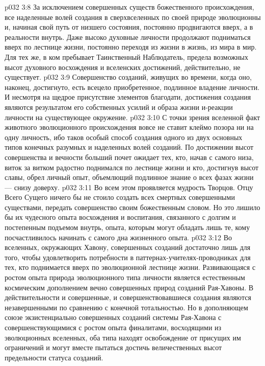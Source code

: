 \vs p032 3:8 \pc За исключением совершенных существ божественного происхождения, все наделенные волей создания в сверхвселенных по своей природе эволюционны и, начиная свой путь от низшего состояния, постоянно продвигаются вверх, а в реальности внутрь. Даже высоко духовные личности продолжают подниматься вверх по лестнице жизни, постоянно переходя из жизни в жизнь, из мира в мир. Для тех же, в ком пребывает Таинственный Наблюдатель, предела возможных высот духовного восхождения и вселенских достижений, действительно, не существует.
\vs p032 3:9 Совершенство созданий, живущих во времени, когда оно, наконец, достигнуто, есть всецело приобретенное, подлинное владение личности. И несмотря на щедрое присутствие элементов благодати, достижения создания являются результатом его собственных усилий и образа жизни и\hyp{}реакции личности на существующее окружение.
\vs p032 3:10 С точки зрения вселенной факт животного эволюционного происхождения вовсе не ставит клеймо позора ни на одну личность, ибо таков особый способ создания одного из двух основных типов конечных разумных и наделенных волей созданий. По достижении высот совершенства и вечности больший почет ожидает тех, кто, начав с самого низа, виток за витком радостно поднимался по лестнице жизни и кто, достигнув высот славы, обрел личный опыт, объемлющий подлинное знание о всех фазах жизни --- снизу доверху.
\vs p032 3:11 Во всем этом проявляется мудрость Творцов. Отцу Всего Сущего ничего бы не стоило создать всех смертных совершенными существами, передать совершенство своим божественным словом. Но это лишило бы их чудесного опыта восхождения и воспитания, связанного с долгим и постепенным подъемом внутрь, опыта, которым могут обладать лишь те, кому посчастливилось начинать с самого дна жизненного опыта.
\vs p032 3:12 Во вселенных, окружающих Хавону, совершенных созданий достаточно лишь для того, чтобы удовлетворить потребности в паттернах\hyp{}учителях\hyp{}проводниках для тех, кто поднимается вверх по эволюционной лестнице жизни. Развивающаяся с ростом опыта природа эволюционного типа личности является естественным космическим дополнением вечно совершенных природ созданий Рая\hyp{}Хавоны. В действительности и совершенные, и совершенствовавшиеся создания являются незавершенными по сравнению с конечной тотальностью. Но в дополняющем союзе экзистенциально совершенных созданий системы Рая\hyp{}Хавона с совершенствующимися с ростом опыта финалитами, восходящими из эволюционных вселенных, оба типа находят освобождение от присущих им ограничений и могут вместе пытаться достичь величественных высот предельности статуса созданий.
